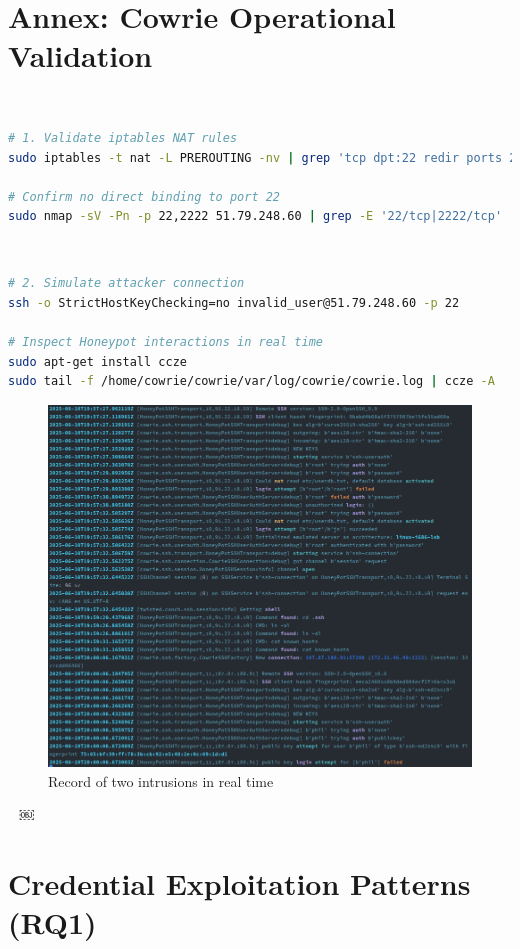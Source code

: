 \section{Annex: Cowrie Operational Validation}  
\label{annex:cowrie-validation}  
\
\
\begin{lstlisting}[language=bash,label={lst:cowrie-redirect},caption={Traffic Redirection Verification}]  
# 1. Validate iptables NAT rules  
sudo iptables -t nat -L PREROUTING -nv | grep 'tcp dpt:22 redir ports 2222'  

# Confirm no direct binding to port 22  
sudo nmap -sV -Pn -p 22,2222 51.79.248.60 | grep -E '22/tcp|2222/tcp'  
\end{lstlisting}  
\
\begin{lstlisting}[language=bash,label={lst:cowrie-access},caption={Honeypot Engagement Testing}]  
# 2. Simulate attacker connection  
ssh -o StrictHostKeyChecking=no invalid_user@51.79.248.60 -p 22  

# Inspect Honeypot interactions in real time  
sudo apt-get install ccze
sudo tail -f /home/cowrie/cowrie/var/log/cowrie/cowrie.log | ccze -A  
\end{lstlisting}  
\begin{figure}[h!]
    \centering
    \includegraphics[width=1\linewidth]{doc/img/annex_c_listing_2.png}
    \caption*{Record of two intrusions in real time}
\end{figure}

\
\newpage
￼
\section{Credential Exploitation Patterns (RQ1)}  
\label{annex:log-credential1}  
\

